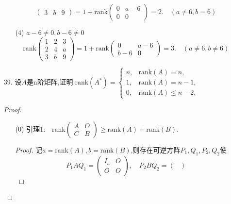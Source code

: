 \documentclass{article}
\begin{document}
\begin{enumerate}
\begin{enumerate}
\[\begin{pmatrix}
                    3 & b & 9
                \end{pmatrix}=
                1+\mbox{rank}\begin{pmatrix}
                    0 & a-6\\
                    0 & 0
                \end{pmatrix}=2.\quad (a\neq 6,b=6)
            \]
            \item [(4)]$a-6\neq 0,b-6\neq 0$
            \[
                \mbox{rank}\begin{pmatrix}
                    1 & 2 & 3\\
                    2 & 4 & a\\
                    3 & b & 9
                \end{pmatrix}=
                1+\mbox{rank}\begin{pmatrix}
                    0 & a-6\\
                    b-6 & 0
                \end{pmatrix}=3.\quad (a\neq 6,b\neq 6)
            \]
        \end{enumerate}
        \item [39.]设$A$是n阶矩阵,证明:$\mbox{rank}(A^*)=\begin{cases}
            n, & \mbox{rank}(A)=n,\\
            1, & \mbox{rank}(A)=n-1,\\
            0, & \mbox{rank}(A)\leqslant n-2.
        \end{cases}$
        \begin{proof}
            \begin{enumerate}
                \item []
                \item [(0)]
                引理1:$\quad \mbox{rank}\begin{pmatrix} A & O\\ C & B \end{pmatrix} \geqslant \mbox{rank}(A)+\mbox{rank}(B)$.
                \begin{proof}
                    记$a=\mbox{rank}(A),b=\mbox{rank}(B)$,则存在可逆方阵$P_1,Q_1,P_2,Q_2$使
                \[
                    P_1 A Q_1=\begin{pmatrix}
                        I_a & O\\
                        O & O
                    \end{pmatrix},\quad
                    P_2 B Q_2=\begin{pmatrix}

\end{pmatrix}\]
\end{proof}
\end{enumerate}
\end{proof}
\end{enumerate}
\end{document}

